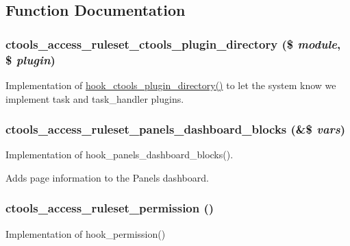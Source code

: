 \subsection{Function Documentation}
\hypertarget{ctools__access__ruleset_8module_a0640f3df46d163f89a3e393ecf665a3a}{
\subsubsection[{ctools\_\-access\_\-ruleset\_\-ctools\_\-plugin\_\-directory}]{\setlength{\rightskip}{0pt plus 5cm}ctools\_\-access\_\-ruleset\_\-ctools\_\-plugin\_\-directory (\$ {\em module}, \/  \$ {\em plugin})}}
\label{ctools__access__ruleset_8module_a0640f3df46d163f89a3e393ecf665a3a}
Implementation of \hyperlink{group__hooks_gaf17a0de7a7ca6e6c30c766ea1e44715e}{hook\_\-ctools\_\-plugin\_\-directory()} to let the system know we implement task and task\_\-handler plugins. \hypertarget{ctools__access__ruleset_8module_ac7795e49e86c81fe209bcd0336701c41}{
\subsubsection[{ctools\_\-access\_\-ruleset\_\-panels\_\-dashboard\_\-blocks}]{\setlength{\rightskip}{0pt plus 5cm}ctools\_\-access\_\-ruleset\_\-panels\_\-dashboard\_\-blocks (\&\$ {\em vars})}}
\label{ctools__access__ruleset_8module_ac7795e49e86c81fe209bcd0336701c41}
Implementation of hook\_\-panels\_\-dashboard\_\-blocks().

Adds page information to the Panels dashboard. \hypertarget{ctools__access__ruleset_8module_a14ebe62d97136a533948fa71657f62ad}{
\subsubsection[{ctools\_\-access\_\-ruleset\_\-permission}]{\setlength{\rightskip}{0pt plus 5cm}ctools\_\-access\_\-ruleset\_\-permission ()}}
\label{ctools__access__ruleset_8module_a14ebe62d97136a533948fa71657f62ad}
Implementation of hook\_\-permission() 